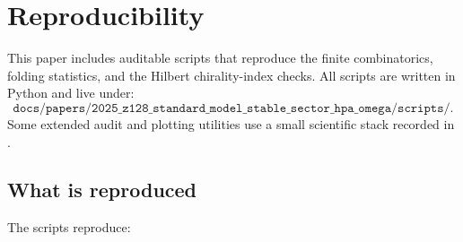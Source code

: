 \section{Reproducibility}
\label{app:reproducibility}

This paper includes auditable scripts that reproduce the finite combinatorics, folding statistics, and the Hilbert chirality-index checks.
All scripts are written in Python and live under:
\[
\texttt{docs/papers/2025\_z128\_standard\_model\_stable\_sector\_hpa\_omega/scripts/}.
\]
Some extended audit and plotting utilities use a small scientific stack recorded in .

\subsection{What is reproduced}
The scripts reproduce:
